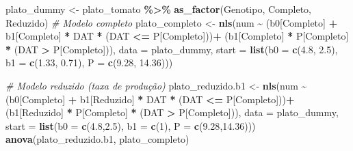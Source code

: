 \documentclass[
]{book}
\newenvironment{Shaded}{\begin{snugshade}}{\end{snugshade}}
\newcommand{\CommentTok}[1]{\textcolor[rgb]{0.56,0.35,0.01}{\textit{#1}}}
\newcommand{\DataTypeTok}[1]{\textcolor[rgb]{0.13,0.29,0.53}{#1}}
\newcommand{\DecValTok}[1]{\textcolor[rgb]{0.00,0.00,0.81}{#1}}
\newcommand{\FloatTok}[1]{\textcolor[rgb]{0.00,0.00,0.81}{#1}}
\newcommand{\KeywordTok}[1]{\textcolor[rgb]{0.13,0.29,0.53}{\textbf{#1}}}
\newcommand{\NormalTok}[1]{#1}
\newcommand{\OperatorTok}[1]{\textcolor[rgb]{0.81,0.36,0.00}{\textbf{#1}}}
\newcommand{\StringTok}[1]{\textcolor[rgb]{0.31,0.60,0.02}{#1}}
\numberwithin{equation}{section}
\begin{document}
\begin{Shaded}
\begin{Highlighting}[]
\NormalTok{plato\_dummy \textless{}{-}}\StringTok{ }
\StringTok{  }\NormalTok{plato\_tomato }\OperatorTok{\%\textgreater{}\%}
\StringTok{  }\KeywordTok{as\_factor}\NormalTok{(Genotipo, Completo, Reduzido)}
\CommentTok{\# Modelo completo}
\NormalTok{plato\_completo \textless{}{-}}\StringTok{ }
\StringTok{  }\KeywordTok{nls}\NormalTok{(num }\OperatorTok{\textasciitilde{}}\StringTok{ }\NormalTok{(b0[Completo] }\OperatorTok{+}\StringTok{ }\NormalTok{b1[Completo] }\OperatorTok{*}\StringTok{ }\NormalTok{DAT }\OperatorTok{*}\StringTok{ }\NormalTok{(DAT }\OperatorTok{\textless{}=}\StringTok{ }\NormalTok{P[Completo]))}\OperatorTok{+}
\StringTok{        }\NormalTok{(b1[Completo] }\OperatorTok{*}\StringTok{ }\NormalTok{P[Completo] }\OperatorTok{*}\StringTok{ }\NormalTok{(DAT }\OperatorTok{\textgreater{}}\StringTok{ }\NormalTok{P[Completo])),}
      \DataTypeTok{data =}\NormalTok{ plato\_dummy,}
      \DataTypeTok{start =} \KeywordTok{list}\NormalTok{(}\DataTypeTok{b0 =} \KeywordTok{c}\NormalTok{(}\FloatTok{4.8}\NormalTok{, }\FloatTok{2.5}\NormalTok{), }
                   \DataTypeTok{b1 =} \KeywordTok{c}\NormalTok{(}\FloatTok{1.33}\NormalTok{, }\FloatTok{0.71}\NormalTok{), }
                   \DataTypeTok{P =} \KeywordTok{c}\NormalTok{(}\FloatTok{9.28}\NormalTok{, }\FloatTok{14.36}\NormalTok{)))}

\CommentTok{\# Modelo reduzido (taxa de produção)}
\NormalTok{plato\_reduzido.b1 \textless{}{-}}\StringTok{ }
\StringTok{  }\KeywordTok{nls}\NormalTok{(num }\OperatorTok{\textasciitilde{}}\StringTok{ }\NormalTok{(b0[Completo] }\OperatorTok{+}\StringTok{ }\NormalTok{b1[Reduzido] }\OperatorTok{*}\StringTok{ }\NormalTok{DAT }\OperatorTok{*}\StringTok{ }\NormalTok{(DAT }\OperatorTok{\textless{}=}\StringTok{ }\NormalTok{P[Completo]))}\OperatorTok{+}
\StringTok{        }\NormalTok{(b1[Reduzido] }\OperatorTok{*}\StringTok{ }\NormalTok{P[Completo] }\OperatorTok{*}\StringTok{ }\NormalTok{(DAT }\OperatorTok{\textgreater{}}\StringTok{ }\NormalTok{P[Completo])),}
      \DataTypeTok{data =}\NormalTok{ plato\_dummy,}
      \DataTypeTok{start =} \KeywordTok{list}\NormalTok{(}\DataTypeTok{b0 =} \KeywordTok{c}\NormalTok{(}\FloatTok{4.8}\NormalTok{,}\FloatTok{2.5}\NormalTok{), }
                   \DataTypeTok{b1 =} \KeywordTok{c}\NormalTok{(}\DecValTok{1}\NormalTok{), }
                   \DataTypeTok{P =} \KeywordTok{c}\NormalTok{(}\FloatTok{9.28}\NormalTok{,}\FloatTok{14.36}\NormalTok{)))}
\KeywordTok{anova}\NormalTok{(plato\_reduzido.b1, plato\_completo)}


\end{Highlighting}
\end{Shaded}
\end{document}
